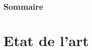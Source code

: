 \documentclass{beamer}
\begin{document}
\begin{frame}
\frametitle{Sommaire} %
\tableofcontents[hideallsubsections]  %
\end{frame}














\section{Etat de l'art}
\end{document}

